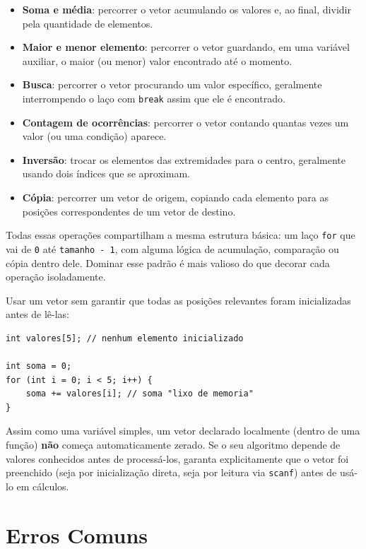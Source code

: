 \documentclass[12pt,a4paper,oneside]{extreport}
\begin{document}
\begin{itemize}
    \item \textbf{Soma e média}: percorrer o vetor acumulando os valores e, ao final, dividir pela quantidade de elementos.
    \item \textbf{Maior e menor elemento}: percorrer o vetor guardando, em uma variável auxiliar, o maior (ou menor) valor encontrado até o momento.
    \item \textbf{Busca}: percorrer o vetor procurando um valor específico, geralmente interrompendo o laço com \texttt{break} assim que ele é encontrado.
    \item \textbf{Contagem de ocorrências}: percorrer o vetor contando quantas vezes um valor (ou uma condição) aparece.
    \item \textbf{Inversão}: trocar os elementos das extremidades para o centro, geralmente usando dois índices que se aproximam.
    \item \textbf{Cópia}: percorrer um vetor de origem, copiando cada elemento para as posições correspondentes de um vetor de destino.
\end{itemize}

Todas essas operações compartilham a mesma estrutura básica: um laço \texttt{for} que vai de \texttt{0} até \texttt{tamanho - 1}, com alguma lógica de acumulação, comparação ou cópia dentro dele. Dominar esse padrão é mais valioso do que decorar cada operação isoladamente.

\begin{errocomum}
Usar um vetor sem garantir que todas as posições relevantes foram inicializadas antes de lê-las:
\begin{lstlisting}
int valores[5]; // nenhum elemento inicializado

int soma = 0;
for (int i = 0; i < 5; i++) {
    soma += valores[i]; // soma "lixo de memoria"
}
\end{lstlisting}
Assim como uma variável simples, um vetor declarado localmente (dentro de uma função) \textbf{não} começa automaticamente zerado. Se o seu algoritmo depende de valores conhecidos antes de processá-los, garanta explicitamente que o vetor foi preenchido (seja por inicialização direta, seja por leitura via \texttt{scanf}) antes de usá-lo em cálculos.
\end{errocomum}

\section{Erros Comuns}
\end{document}
